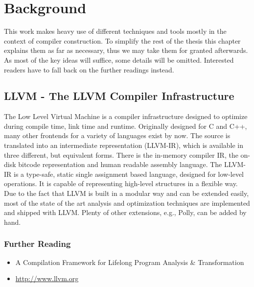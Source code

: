 
\chapter{Background} %
\label{Chapter2}

This work makes heavy use of different techniques  and tools mostly 
in the context of compiler construction. To simplify the rest of the thesis 
this chapter explains them as far as necessary, thus we may take
them for granted afterwards. As most of the key ideas will suffice, 
some details will be omitted. 
Interested readers have to fall back on the further readings instead. 


\section{LLVM - The LLVM Compiler Infrastructure}
\label{LLVM}
The Low Level Virtual Machine is a compiler infrastructure designed to optimize
during compile time, link time and runtime. Originally designed for C and C++, 
many other frontends for a variety of languages exist by now. The source is 
translated into an intermediate representation (LLVM-IR), which is available 
in three different, but equivalent forms. There is the in-memory compiler IR, 
the on-disk bitcode representation and human readable assembly language.
The LLVM-IR is a type-safe, static single assignment based language,
designed for low-level operations. It is capable of 
representing high-level structures in a flexible way.
Due to the fact that LLVM is built in a modular 
way and can be extended easily, most of the state of the art analysis and
optimization techniques are implemented and shipped with LLVM. Plenty of other
extensions, e.g., Polly, can be added by hand. 


\subsection*{Further Reading}

\begin{itemize}
  \item A Compilation Framework for Lifelong Program Analysis \& Transformation
    \cite{LLVM:CGO04}  
  \item \url{http://www.llvm.org} \nocite{LLVM:Online}
\end{itemize}



